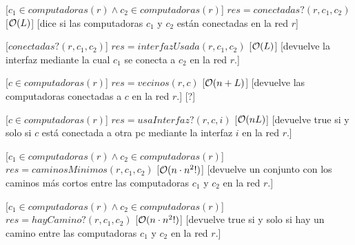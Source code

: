 \begin{Interfaz}
  [$c_1 \in computadoras(r) \land c_2 \in computadoras(r)$]
  {$res = conectadas?(r,c_1,c_2)$}
  [$\mathcal{O}(L)$]
  [dice si las computadoras $c_1$ y $c_2$ están conectadas en la red $r$]


  [$conectadas?(r,c_1,c_2)$]
  {$res = interfazUsada(r,c_1,c_2)$}
  [$\mathcal{O}(L)$]
  [devuelve la interfaz mediante la cual $c_1$ se conecta a $c_2$  en la red $r$.]


  [$c \in computadoras(r)$]
  {$res = vecinos(r,c)$}
  [$\mathcal{O}(n+L)$]
  [devuelve las computadoras conectadas a $c$ en la red $r$.]
  [?]


  [$c \in computadoras(r)$]
  {$res = usaInterfaz?(r,c,i)$}
  [$\mathcal{O}(nL)$]
  [devuelve true si y solo si $c$ está conectada a otra pc mediante la interfaz $i$ en la red $r$.]


  [$c_1 \in computadoras(r) \land c_2 \in computadoras(r)$]
  {$res = caminosMinimos(r,c_1,c_2)$}
  [$\mathcal{O}(n \cdot n^2!)$]
  [devuelve un conjunto con los caminos más cortos entre las computadoras $c_1$ y $c_2$ en la red $r$.]


  [$c_1 \in computadoras(r) \land c_2 \in computadoras(r)$]
  {$res = hayCamino?(r,c_1,c_2)$} 
  [$\mathcal{O}(n \cdot n^2!)$]
  [devuelve true si y solo si hay un camino entre las computadoras $c_1$ y $c_2$ en la red $r$.]



\end{Interfaz}

